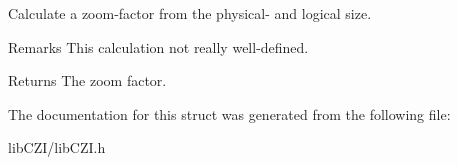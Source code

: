 Calculate a zoom-\/factor from the physical-\/ and logical size. \begin{DoxyRemark}{Remarks}
This calculation not really well-\/defined. 
\end{DoxyRemark}
\begin{DoxyReturn}{Returns}
The zoom factor. 
\end{DoxyReturn}


The documentation for this struct was generated from the following file\+:\begin{DoxyCompactItemize}
\item 
lib\+C\+Z\+I/lib\+C\+Z\+I.\+h\end{DoxyCompactItemize}
